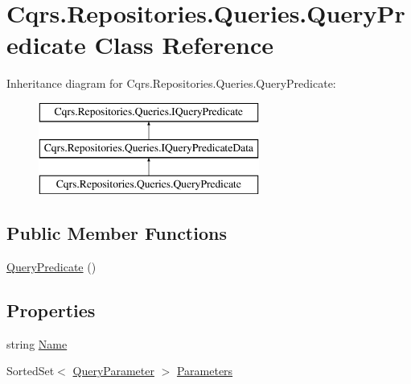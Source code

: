 \hypertarget{classCqrs_1_1Repositories_1_1Queries_1_1QueryPredicate}{}\section{Cqrs.\+Repositories.\+Queries.\+Query\+Predicate Class Reference}
\label{classCqrs_1_1Repositories_1_1Queries_1_1QueryPredicate}
Inheritance diagram for Cqrs.\+Repositories.\+Queries.\+Query\+Predicate\+:\begin{figure}[H]
\begin{center}
\leavevmode
\includegraphics[height=3.000000cm]{classCqrs_1_1Repositories_1_1Queries_1_1QueryPredicate}
\end{center}
\end{figure}
\subsection*{Public Member Functions}
\begin{DoxyCompactItemize}
\item 
\hyperlink{classCqrs_1_1Repositories_1_1Queries_1_1QueryPredicate_ab690c78e98470fe4e219380db1c0e52c_ab690c78e98470fe4e219380db1c0e52c}{Query\+Predicate} ()
\end{DoxyCompactItemize}
\subsection*{Properties}
\begin{DoxyCompactItemize}
\item 
string \hyperlink{classCqrs_1_1Repositories_1_1Queries_1_1QueryPredicate_a39ade65d87e51fcf9abf8e79cb5d62df_a39ade65d87e51fcf9abf8e79cb5d62df}{Name}
\item 
Sorted\+Set$<$ \hyperlink{classCqrs_1_1Repositories_1_1Queries_1_1QueryParameter}{Query\+Parameter} $>$ \hyperlink{classCqrs_1_1Repositories_1_1Queries_1_1QueryPredicate_abc33bd25e43bcef2a084cde97bc478e6_abc33bd25e43bcef2a084cde97bc478e6}{Parameters}
\end{DoxyCompactItemize}


